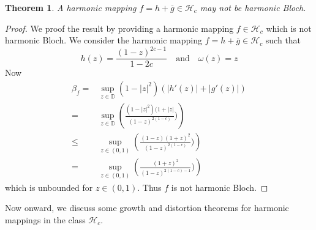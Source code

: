 \documentclass[a4paper,12pt]{amsart}
\newtheorem{thm}{Theorem}[section]
\theoremstyle{definition}
\begin{document}
	
\begin{thm}
	A harmonic mapping $f=h+\overline{g}\in\mathcal{H}_c$ may not be harmonic Bloch.
\end{thm}	
\begin{proof}
	We proof the result by providing a harmonic mapping $f\in\mathcal{H}_c$ which is not harmonic Bloch. We consider the harmonic mapping $f=h+\overline{g}\in\mathcal{H}_c$ such that $$h(z)=\frac{(1-z)^{2c-1}}{1-2c}\quad\text{and}\quad \omega(z)=z$$
	Now 
	\begin{align*}
		\beta_f=&\sup_{z\in\mathbb{D}}(1-|z|^2)(|h'(z)|+|g'(z)|)\\
		=&\sup_{z\in\mathbb{D}}\left(\frac{(1-|z|^2)(1+|z|}{(1-z)^{2(1-c)}})\right)\\
		\le &\sup_{z\in(0,1)}\left(\frac{(1-z)(1+z)^2}{(1-z)^{2(1-c)}})\right)\\
		=&\sup_{z\in(0,1)}\left(\frac{(1+z)^2}{(1-z)^{2(1-c)-1}})\right)
	\end{align*}
	which is unbounded for $z\in(0,1).$ Thus $f$ is not harmonic Bloch.
\end{proof}	
	
	
	Now onward, we discuss some growth and distortion theorems for harmonic mappings in the class $\mathcal{H}_c.$
	
\end{document}
